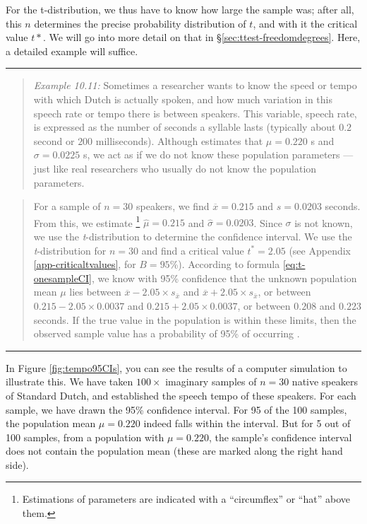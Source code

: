\documentclass[
]{book}
\begin{document}
For the t-distribution, we thus have to know how large the sample was;
after all, this \(n\) determines the precise probability distribution of \(t\),
and with it the critical value \(t*\). We will go into more detail on that
in §\ref{sec:ttest-freedomdegrees}. Here, a detailed example will
suffice.

\begin{center}\rule{0.5\linewidth}{0.5pt}\end{center}

\begin{quote}
\emph{Example 10.11:}
Sometimes a researcher wants to know the speed or tempo with which Dutch is actually spoken,
and how much variation in this speech rate or tempo there is between speakers.
This variable, speech rate, is expressed as the number of seconds
a syllable lasts (typically about \(0.2\) second or \(200\) milliseconds). Although \citet{Quene08}
estimates that \(\mu=0.220\) s and \(\sigma=0.0225\) s, we act as if
we do not know these population parameters --- just like real
researchers who usually do not know
the population parameters.
\end{quote}

\begin{quote}
For a sample of \(n=30\) speakers, we find \(\overline{x}=0.215\)
and
\(s=0.0203\) seconds. From this, we estimate \footnote{Estimations of parameters are indicated with a ``circumflex'' or ``hat'' above them.}
\(\hat{\mu}=0.215\) and
\(\hat{\sigma}=0.0203\). Since \(\sigma\) is not known, we use
the \emph{t}-distribution to determine the confidence interval. We
use the \emph{t}-distribution for \(n=30\) and find a critical value
\(t^*=2.05\) (see Appendix \ref{app-criticaltvalues}, for \(B=95\)\%).
According to formula \eqref{eq:t-onesampleCI}, we know with 95\%
confidence that the unknown population mean \(\mu\) lies
between \(\overline{x}-2.05\times s_{\bar{x}}\) and \(\overline{x}+2.05\times s_{\bar{x}}\),
or between \(0.215-2.05\times0.0037\) and
\(0.215+2.05\times0.0037\),
or between \(0.208\) and \(0.223\) seconds.
If the true value in the population is within these limits, then the observed sample value has a probability of 95\% of occurring \citep[p.241]{Spie19}.
\end{quote}

\begin{center}\rule{0.5\linewidth}{0.5pt}\end{center}

In Figure \ref{fig:tempo95CIs}, you can see the results of a
computer simulation to illustrate this. We have taken \(100\times\)
imaginary samples of \(n=30\) native speakers of Standard Dutch, and established the
speech tempo of these speakers. For each sample, we have drawn
the 95\% confidence interval. For 95 of the 100 samples, the population
mean \(\mu=0.220\) indeed falls within the interval.
But for 5 out of 100 samples, from a population with \(\mu=0.220\), the sample's confidence interval does not contain the population mean (these are marked along the right hand side).
\end{document}
